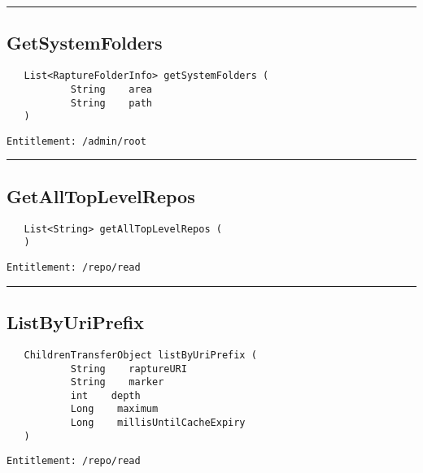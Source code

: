 \rule{12cm}{2pt}
\subsection{GetSystemFolders}
\label{Api:GetSystemFolders}
\begin{Verbatim}
   List<RaptureFolderInfo> getSystemFolders (
           String    area
           String    path
   )
\end{Verbatim}
\begin{Verbatim}[formatcom=\color{Maroon}]
  Entitlement: /admin/root
\end{Verbatim}



\rule{12cm}{2pt}
\subsection{GetAllTopLevelRepos}
\label{Api:GetAllTopLevelRepos}
\begin{Verbatim}
   List<String> getAllTopLevelRepos (
   )
\end{Verbatim}
\begin{Verbatim}[formatcom=\color{Maroon}]
  Entitlement: /repo/read
\end{Verbatim}



\rule{12cm}{2pt}
\subsection{ListByUriPrefix}
\label{Api:ListByUriPrefix}
\begin{Verbatim}
   ChildrenTransferObject listByUriPrefix (
           String    raptureURI
           String    marker
           int    depth
           Long    maximum
           Long    millisUntilCacheExpiry
   )
\end{Verbatim}
\begin{Verbatim}[formatcom=\color{Maroon}]
  Entitlement: /repo/read
\end{Verbatim}



